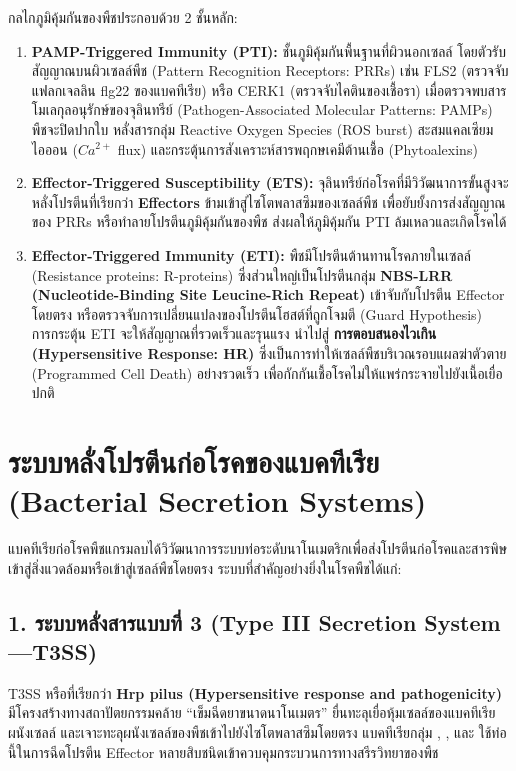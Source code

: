 กลไกภูมิคุ้มกันของพืชประกอบด้วย 2 ชั้นหลัก:
\begin{enumerate}
    \item \textbf{PAMP-Triggered Immunity (PTI):} ชั้นภูมิคุ้มกันพื้นฐานที่ผิวนอกเซลล์ โดยตัวรับสัญญาณบนผิวเซลล์พืช (Pattern Recognition Receptors: PRRs) เช่น FLS2 (ตรวจจับแฟลกเจลลิน flg22 ของแบคทีเรีย) หรือ CERK1 (ตรวจจับไคตินของเชื้อรา) เมื่อตรวจพบสารโมเลกุลอนุรักษ์ของจุลินทรีย์ (Pathogen-Associated Molecular Patterns: PAMPs) พืชจะปิดปากใบ หลั่งสารกลุ่ม Reactive Oxygen Species (ROS burst) สะสมแคลเซียมไอออน ($Ca^{2+}$ flux) และกระตุ้นการสังเคราะห์สารพฤกษเคมีต้านเชื้อ (Phytoalexins)
    \item \textbf{Effector-Triggered Susceptibility (ETS):} จุลินทรีย์ก่อโรคที่มีวิวัฒนาการขั้นสูงจะหลั่งโปรตีนที่เรียกว่า \textbf{Effectors} ข้ามเข้าสู่ไซโตพลาสซึมของเซลล์พืช เพื่อยับยั้งการส่งสัญญาณของ PRRs หรือทำลายโปรตีนภูมิคุ้มกันของพืช ส่งผลให้ภูมิคุ้มกัน PTI ล้มเหลวและเกิดโรคได้
    \item \textbf{Effector-Triggered Immunity (ETI):} พืชมีโปรตีนต้านทานโรคภายในเซลล์ (Resistance proteins: R-proteins) ซึ่งส่วนใหญ่เป็นโปรตีนกลุ่ม \textbf{NBS-LRR (Nucleotide-Binding Site Leucine-Rich Repeat)} เข้าจับกับโปรตีน Effector โดยตรง หรือตรวจจับการเปลี่ยนแปลงของโปรตีนโฮสต์ที่ถูกโจมตี (Guard Hypothesis) การกระตุ้น ETI จะให้สัญญาณที่รวดเร็วและรุนแรง นำไปสู่ \textbf{การตอบสนองไวเกิน (Hypersensitive Response: HR)} ซึ่งเป็นการทำให้เซลล์พืชบริเวณรอบแผลฆ่าตัวตาย (Programmed Cell Death) อย่างรวดเร็ว เพื่อกักกันเชื้อโรคไม่ให้แพร่กระจายไปยังเนื้อเยื่อปกติ
\end{enumerate}

\section{ระบบหลั่งโปรตีนก่อโรคของแบคทีเรีย (Bacterial Secretion Systems)}

แบคทีเรียก่อโรคพืชแกรมลบได้วิวัฒนาการระบบท่อระดับนาโนเมตริกเพื่อส่งโปรตีนก่อโรคและสารพิษเข้าสู่สิ่งแวดล้อมหรือเข้าสู่เซลล์พืชโดยตรง ระบบที่สำคัญอย่างยิ่งในโรคพืชได้แก่:

\subsection{1. ระบบหลั่งสารแบบที่ 3 (Type III Secretion System —T3SS)}
T3SS หรือที่เรียกว่า \textbf{Hrp pilus (Hypersensitive response and pathogenicity)} มีโครงสร้างทางสถาปัตยกรรมคล้าย ``เข็มฉีดยาขนาดนาโนเมตร'' ยื่นทะลุเยื่อหุ้มเซลล์ของแบคทีเรีย ผนังเซลล์ และเจาะทะลุผนังเซลล์ของพืชเข้าไปยังไซโตพลาสซึมโดยตรง แบคทีเรียกลุ่ม , , และ  ใช้ท่อนี้ในการฉีดโปรตีน Effector หลายสิบชนิดเข้าควบคุมกระบวนการทางสรีรวิทยาของพืช

